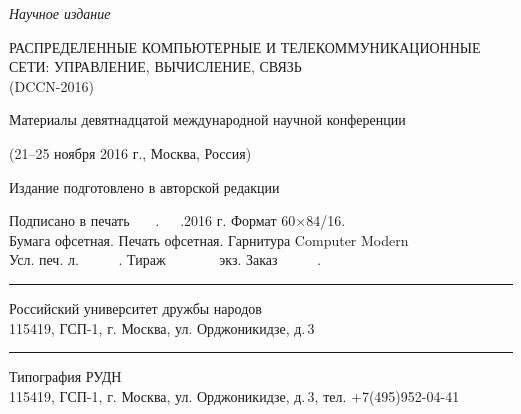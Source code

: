 \clearpage
\thispagestyle{empty}


\begin{center}

\textit{Научное издание}

\end{center}

\bigskip

\begin{center}

{\large

\MakeUppercase{Распределенные компьютерные и телекоммуникационные сети: управление, вычисление, связь}\\
(DCCN-2016)

\bigskip
\bigskip
\bigskip

Материалы девятнадцатой международной научной конференции

\volume

(21–25 ноября 2016 г., Москва, Россия)

}

\end{center}



\bigskip
\bigskip
\bigskip

\begin{center}
Издание подготовлено в авторской редакции
\end{center}

\bigskip

\bigskip

\begin{center}


\smallskip



\smallskip




\end{center}

\vfill

\noindent
\begin{center}
  Подписано в печать \ \ \ .\ \ \ .2016 г. Формат 60×84/16.\\
  Бумага офсетная. Печать офсетная. Гарнитура Computer Modern\\
  Усл. печ. л. \ \ \ \ \ . Тираж \ \ \ \ \ \ \  экз.  Заказ \ \ \ \ \ .
\end{center}

\bigskip

\hrule
 \begin{center}
   Российский университет дружбы народов\\
   115419, ГСП-1, г. Москва, ул. Орджоникидзе, д.\,3
\end{center}
\hrule

\bigskip
 \begin{center}
   Типография РУДН \\115419, ГСП-1, г. Москва,
   ул. Орджоникидзе, д.\,3,  тел. +7(495)952-04-41
\end{center}


